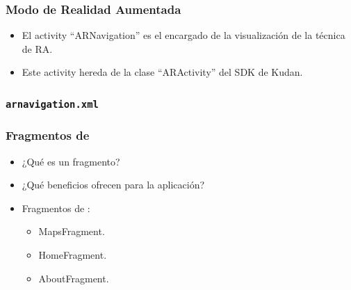 \begin{frame}
	\frametitle{Modo de Realidad Aumentada}
			\begin{itemize}
				\item El activity ``ARNavigation'' es el encargado de la visualización de la técnica de RA.
				\item Este activity hereda de la clase ``ARActivity'' del SDK de Kudan.
			\end{itemize}
			\endblock{}

\end{frame}

\begin{frame}
	\frametitle{\texttt{arnavigation.xml}}
	
\end{frame}

\begin{frame}
	\frametitle{Fragmentos de \ULLAR{}}
			\begin{itemize}
				\item ¿Qué es un fragmento?
				\item ¿Qué beneficios ofrecen para la aplicación?
				\item Fragmentos de \ULLAR{}:
				\begin{itemize}
					\item MapsFragment.
					\item HomeFragment.
					\item AboutFragment.
				\end{itemize}
			\end{itemize}
			\endblock{}

\end{frame}

    

